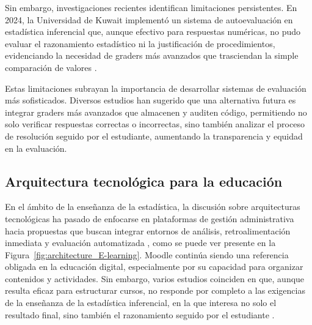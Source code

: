 \documentclass[letter,oneside,12pt,spanish]{report}
\begin{document}
Sin embargo, investigaciones recientes identifican limitaciones persistentes. En 2024, la Universidad de Kuwait implementó un sistema de autoevaluación en estadística inferencial que, aunque efectivo para respuestas numéricas, no pudo evaluar el razonamiento estadístico ni la justificación de procedimientos, evidenciando la necesidad de graders más avanzados que trasciendan la simple comparación de valores \parencite{AlHaddad2024}.

Estas limitaciones subrayan la importancia de desarrollar sistemas de evaluación más sofisticados. Diversos estudios han sugerido que una alternativa futura es integrar graders más avanzados que almacenen y auditen código, permitiendo no solo verificar respuestas correctas o incorrectas, sino también analizar el proceso de resolución seguido por el estudiante, aumentando la transparencia y equidad en la evaluación.


\subsection{Arquitectura tecnológica para la educación}

En el ámbito de la enseñanza de la estadística, la discusión sobre arquitecturas tecnológicas ha pasado de enfocarse en plataformas de gestión administrativa hacia propuestas que buscan integrar entornos de análisis, retroalimentación inmediata y evaluación automatizada \parencite{Blank2017}, como se puede ver presente en la Figura~\ref{fig:architecture_E-learning}. Moodle continúa siendo una referencia obligada en la educación digital, especialmente por su capacidad para organizar contenidos y actividades. Sin embargo, varios estudios coinciden en que, aunque resulta eficaz para estructurar cursos, no responde por completo a las exigencias de la enseñanza de la estadística inferencial, en la que interesa no solo el resultado final, sino también el razonamiento seguido por el estudiante \parencite{Pacheco2025, Ndibalema2025}.
\end{document}
